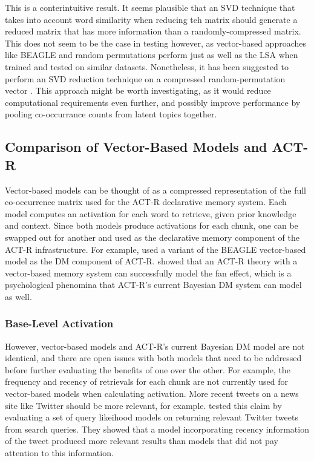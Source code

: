 \documentclass[man,floatsintext]{apa6}
\begin{document}
This is a conterintuitive result.
It seems plausible that an SVD technique that takes into account word similarity when reducing teh matrix should generate a reduced matrix that has more information than a randomly-compressed matrix.
This does not seem to be the case in testing however, as vector-based approaches like BEAGLE and random permutations perform just as well as the LSA when trained and tested on similar datasets.
Nonetheless, it has been suggested to perform an SVD reduction technique on a compressed random-permutation vector \parencite{Kanerva2000}.
This approach might be worth investigating, as it would reduce computational requirements even further, and possibly improve performance by pooling co-occurrance counts from latent topics together.

\subsection{Comparison of Vector-Based Models and ACT-R}

Vector-based models can be thought of as a compressed representation of the full co-occurrence matrix used for the ACT-R declarative memory system.
Each model computes an activation for each word to retrieve, given prior knowledge and context.
Since both models produce activations for each chunk, one can be swapped out for another and used as the declarative memory component of the ACT-R infrastructure.
For example, \textcite{Rutledge2007} used a variant of the BEAGLE vector-based model as the DM component of ACT-R.
\textcite{Rutledge2008} showed that an ACT-R theory with a vector-based memory system can successfully model the fan effect, which is a psychological phenomina that ACT-R's current Bayesian DM system can model as well.

\subsubsection{Base-Level Activation}

However, vector-based models and ACT-R's current Bayesian DM model are not identical, and there are open issues with both models that need to be addressed before further evaluating the benefits of one over the other.
For example, the frequency and recency of retrievals for each chunk are not currently used for vector-based models when calculating activation.
More recent tweets on a news site like Twitter should be more relevant, for example.
\textcite{Efron2011} tested this claim by evaluating a set of query likeihood models on returning relevant Twitter tweets from search queries.
They showed that a model incorporating recency information of the tweet produced more relevant results than models that did not pay attention to this information.
\end{document}
